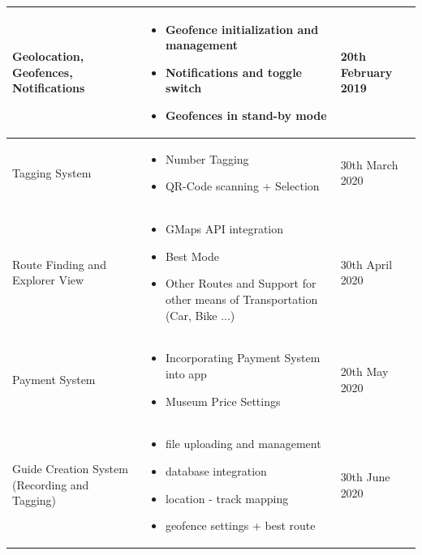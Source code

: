 \documentclass[12pt]{article}
\theoremstyle{definition}
\begin{document}
\begin{tabular}{| m{9em} | m{9cm} | m{4cm} |}
    Geolocation, \linebreak Geofences, \linebreak Notifications &
    \begin{itemize} [topsep=0.2cm]
        \item Geofence initialization and management
        \item Notifications and toggle switch
        \item Geofences in stand-by mode     
    \end{itemize} \nointerlineskip &
     20th February 2019  \\ \hline
    
    Tagging System &
    \begin{itemize} [topsep=0.2cm]
        \item Number Tagging
        \item QR-Code scanning + Selection
    \end{itemize} \nointerlineskip &
    30th March 2020 \\ \hline
     
    Route Finding and Explorer View &
    \begin{itemize} [topsep=0.2cm]
        \item GMaps API integration
        \item Best Mode
        \item Other Routes and Support for other means of Transportation (Car, Bike ...)
    \end{itemize} \nointerlineskip &
    30th April 2020 \\ \hline
    
    Payment System &
    \begin{itemize} [topsep=0.2cm]
        \item Incorporating Payment System into app
        \item Museum Price Settings
    \end{itemize} \nointerlineskip &
    20th May 2020 \\ \hline
    
    Guide Creation System (Recording and Tagging) &
    \begin{itemize} [topsep=0.2cm]
        \item file uploading and management
        \item database integration
        \item location - track mapping
        \item geofence settings + best route
    \end{itemize} \nointerlineskip &
    30th June 2020 \\ \hline
    

\end{tabular}
\end{document}
